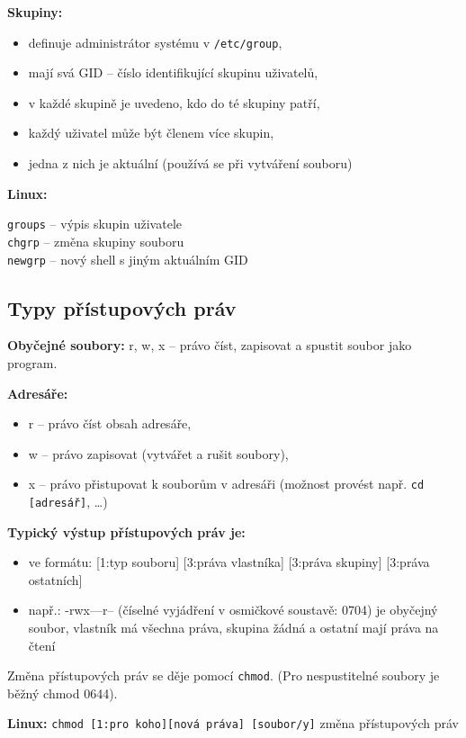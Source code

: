 \documentclass[a4paper, 11pt]{article}
\newcommand{\tcmd}[1]{\texttt{#1}}
\begin{document}
\textbf{Skupiny:}
\begin{itemize}
    \item definuje administrátor systému v \tcmd{/etc/group},
    \item mají svá GID -- číslo identifikující skupinu uživatelů,
    \item v každé skupině je uvedeno, kdo do té skupiny patří,
    \item každý uživatel může být členem více skupin,
    \item jedna z nich je aktuální (používá se při vytváření souboru)
\end{itemize}
 
\textbf{Linux:}

\tcmd{groups} -- výpis skupin uživatele \\[0.2em]
\tcmd{chgrp} -- změna skupiny souboru \\[0.2em]
\tcmd{newgrp} -- nový shell s jiným aktuálním GID

\subsection{Typy přístupových práv}
\textbf{Obyčejné soubory:} r, w, x -- právo číst, zapisovat a spustit soubor jako program.
 
\textbf{Adresáře:}
\begin{itemize}
    \item r -- právo číst obsah adresáře,
    \item w -- právo zapisovat (vytvářet a rušit soubory),
    \item x -- právo přistupovat k souborům v adresáři (možnost provést např. \tcmd{cd [adresář]}, \ldots)
\end{itemize}
 
\textbf{Typický výstup přístupových práv je:}
\begin{itemize}
    \item ve formátu: [1:typ souboru] [3:práva vlastníka] [3:práva skupiny] [3:práva ostatních]
    \item např.: -rwx---r-- (číselné vyjádření v osmičkové soustavě: 0704) je obyčejný soubor, vlastník má všechna práva, skupina žádná a ostatní mají práva na čtení
\end{itemize}
 
Změna přístupových práv se děje pomocí \tcmd{chmod}. (Pro nespustitelné soubory je běžný chmod 0644).
 
\textbf{Linux:}
\tcmd{chmod [1:pro koho][nová práva] [soubor/y]} změna přístupových práv
\end{document}
